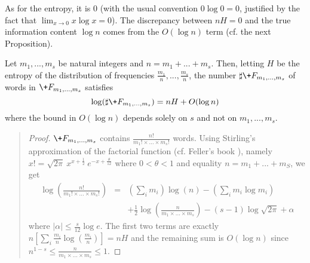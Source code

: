 As for the entropy, it is $0$
(with the usual convention $0\log 0=0$, justified by the fact that
$\lim_{x\to0}x\log x=0$).
The discrepancy between $nH=0$ and the true information content
$\log n$ comes from the $O(\log n)$ term (cf. the next Proposition).
\begin{proposition}\label{p:H}
Let $m_1,...,m_s$ be natural integers and $n=m_1+...+m_s$.
Then, letting $H$ be the entropy of the distribution of frequencies
$\frac{m_1}{n},...,\frac{m_s}{n}$,
the number $\sharp\+F_{m_1,...,m_s}$ of words in
$\+F_{m_1,...,m_s}$ satisfies
$$
\log(\sharp\+F_{m_1,...,m_s}) = nH + O(\log n)
$$
where the bound in $O(\log n)$ depends solely on $s$
and not on $m_1,...,m_s$.
\end{proposition}
{\small\begin{quote}
\begin{proof}
$\+F_{m_1,...,m_s}$ contains
$\frac{n!}{m_1!\times...\times m_s!}$ words.
Using Stirling's approximation of the factorial function
(cf. Feller's book \cite{feller}), namely
$x! = \sqrt{2\pi} \ x^{x+\frac{1}{2}} \ e^{-x+\frac{\theta}{12}}$
where $0<\theta<1$ and equality $n=m_1+...+m_S$, we get
\begin{eqnarray*}
\log(\frac{n!}{m_1!\times...\times m_s!})
&=& (\sum_i m_i)\log(n) - (\sum_i m_i\log m_i)
\\&& 
+\frac{1}{2} \log(\frac{n}{m_1\times...\times m_s})
-(s-1)\log\sqrt{2\pi} + \alpha
\end{eqnarray*}
where $|\alpha|\leq\frac{s}{12}\log e$.
The first two terms are exactly
$n[\sum_i\frac{m_i}{n}\log(\frac{m_i}{n})] = nH$
and the remaining sum is $O(\log n)$ since
$n^{1-s} \leq \frac{n}{m_1\times...\times m_s} \leq 1$.
\end{proof}
\end{quote}}

